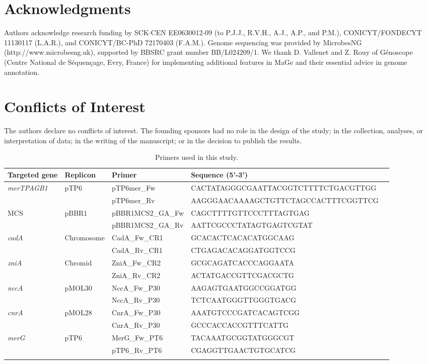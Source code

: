 \section{Acknowledgments}
Authors acknowledge research funding by SCK$\cdot$CEN EE0630012-09 (to P.J.J., R.V.H., A.J., A.P., and P.M.), CONICYT/FONDECYT 11130117 (L.A.R.), and CONICYT/BC-PhD 72170403 (F.A.M.). Genome sequencing was provided by MicrobesNG (http://www.microbesng.uk), supported by BBSRC grant number BB/L024209/1. We thank D. Vallenet and Z. Rouy of Génoscope (Centre National de Séquençage, Evry, France) for implementing additional features in MaGe and their essential advice in genome annotation.

\section{Conflicts of Interest}
The authors declare no conflicts of interest. The founding sponsors had no role in the design of the study; in the collection, analyses, or interpretation of data; in the writing of the manuscript; or in the decision to publish the results.


\begin{table}
\caption{Primers used in this study.\\}
\label{table:44}%
{%
\begin{tabular*}{\columnwidth}{@{}lllll@{}}
\hline
\textbf{Targeted gene} & \textbf{Replicon} & \textbf{Primer} & \textbf{Sequence (5'-3')} \\
\hline
\textit{merTPAGB1} & pTP6 & pTP6mer\_Fw & CACTATAGGGCGAATTACGGTCTTTTCTGACGTTGG\\
& & pTP6mer\_Rv & AAGGGAACAAAAGCTGTTCTAGCCACTTTCGGTTCG\\
MCS & pBBR1 & pBBR1MCS2\_GA\_Fw & CAGCTTTTGTTCCCTTTAGTGAG\\
 &  & pBBR1MCS2\_GA\_Rv & AATTCGCCCTATAGTGAGTCGTAT\\
\textit{cadA} & Chromosome & CadA\_Fw\_CR1 & GCACACTCACACATGGCAAG\\
 &  & CadA\_Rv\_CR1 & CTGAGACACAGGATGGTCCG\\
\textit{zniA} & Chromid  & ZniA\_Fw\_CR2 & GCGCAGATCACCCAGGAATA\\
 &  & ZniA\_Rv\_CR2 & ACTATGACCGTTCGACGCTG\\
\textit{nccA} & pMOL30 & NccA\_Fw\_P30 & AAGAGTGAATGGCCGGATGG\\
 &  & NccA\_Rv\_P30 & TCTCAATGGGTTGGGTGACG\\
 \textit{cnrA} & pMOL28 & CnrA\_Fw\_P30 & AAATGTCCCGATCACAGTCGG\\
 &  & CnrA\_Rv\_P30 & GCCCACCACCGTTTCATTG\\
  \textit{merG} & pTP6 & MerG\_Fw\_PT6 & TACAAATGCGGTATGGGCGT\\
 &  & pTP6\_Rv\_PT6 & CGAGGTTGAACTGTGCATCG\\
\\
\hline
\hline
\end{tabular*}
}
\\
{
}
\end{table}


